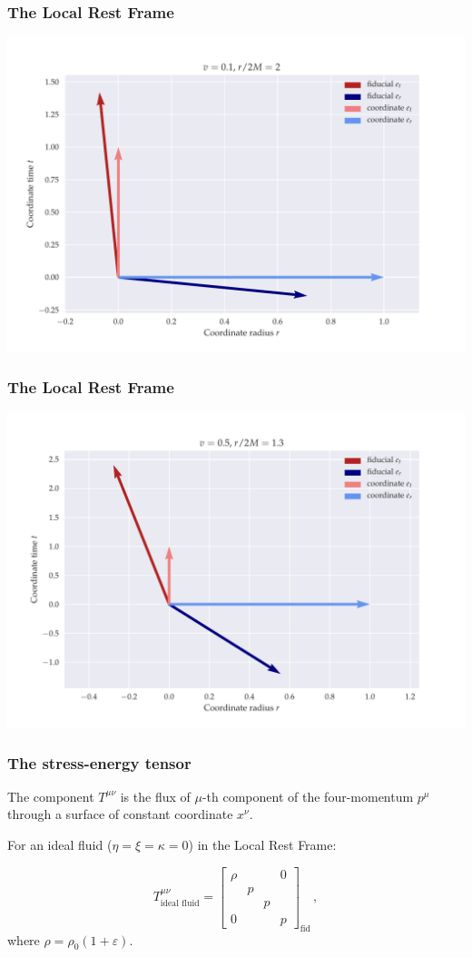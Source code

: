 \documentclass{beamer}
\begin{document}
\begin{frame}
    \frametitle{The Local Rest Frame}
        \includegraphics[width=\textwidth]{figures/low_speed}
\end{frame}

\begin{frame}
    \frametitle{The Local Rest Frame}
        \includegraphics[width=\textwidth]{figures/high_speed}
\end{frame}

\begin{frame}
    \frametitle{The stress-energy tensor}

    The component \(T^{\mu\nu}\) is the flux of \(\mu\)-th component of the four-momentum \(p^\mu\) through a surface of constant coordinate \(x^\nu\).

    For an ideal fluid (\(\eta = \xi = \kappa = 0\)) in the Local Rest Frame:

    \begin{equation*}
        T^{\mu\nu}_{\text{ideal fluid}} =
        \begin{bmatrix}
        \rho   &   &   & 0  \\
           & p  &   &  \\
           &   & p  &  \\
          0 &   &   & p
       \end{bmatrix}_{\text{fid}} \,,
    \end{equation*}
    where \(\rho = \rho_0 (1 + \varepsilon)\).
\end{frame}
\end{document}
